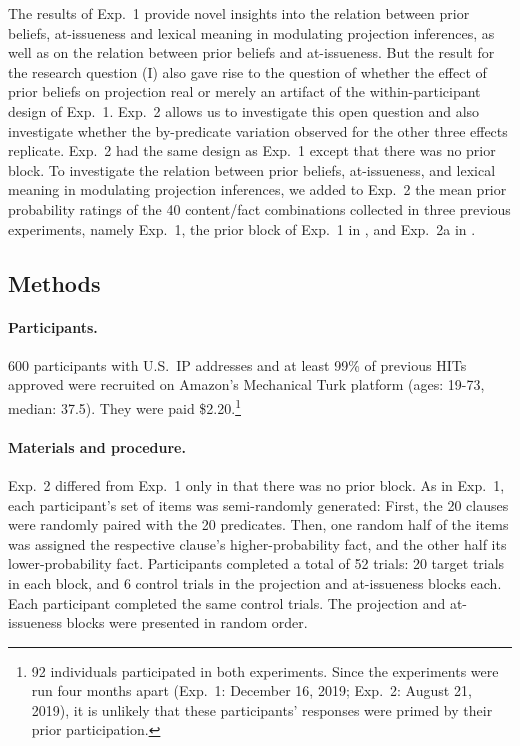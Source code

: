 \documentclass[11pt,fleqn]{article}
\newcommand{\6}{\mbox{$[\hspace*{-.6mm}[$}}
\newcommand{\9}{\mbox{$]\hspace*{-.6mm}]$}}
\begin{document}
The results of Exp.~1 provide novel insights into the relation between prior beliefs, at-issueness and lexical meaning in modulating projection inferences, as well as on the relation between prior beliefs and at-issueness. But the result for the research question (I) also gave rise to the question of whether the effect of prior beliefs on projection real or merely an artifact of the within-participant design of Exp.~1. Exp.~2 allows us to investigate this open question and also investigate whether the by-predicate variation observed for the other three effects replicate. Exp.~2 had the same design as Exp.~1 except that there was no prior block. To investigate the relation between prior beliefs, at-issueness, and lexical meaning in modulating projection inferences, we added to Exp.~2 the mean prior probability ratings of the 40 content/fact combinations collected in three previous experiments, namely Exp.~1, the prior block of Exp.~1 in \citealt{degen-tonhauser-openmind}, and Exp.~2a in \citealt{degen-tonhauser-openmind}. 

\subsection{Methods}

\paragraph{Participants.} 600 participants with U.S.\ IP addresses and at least 99\% of previous HITs approved were recruited on Amazon's Mechanical Turk platform (ages: 19-73, median: 37.5). They were paid \$2.20.\footnote{92 individuals participated in both experiments. Since the experiments were run four months apart (Exp.~1: December 16, 2019; Exp.~2: August 21, 2019), it is unlikely that these participants' responses were primed by their prior participation.}

\paragraph{Materials and procedure.}  Exp.~2 differed from Exp.~1 only in that there was no prior block. As in Exp.~1, each participant's set of items was semi-randomly generated: First, the 20 clauses were randomly paired with the 20 predicates. Then, one random half of the items was assigned the respective clause's higher-probability fact, and the other half its lower-probability fact. Participants completed a total of 52 trials: 20 target trials in each block, and 6 control trials in the projection and at-issueness blocks each. Each participant completed the same control trials. The projection and at-issueness blocks were presented in random order. 
\end{document}
